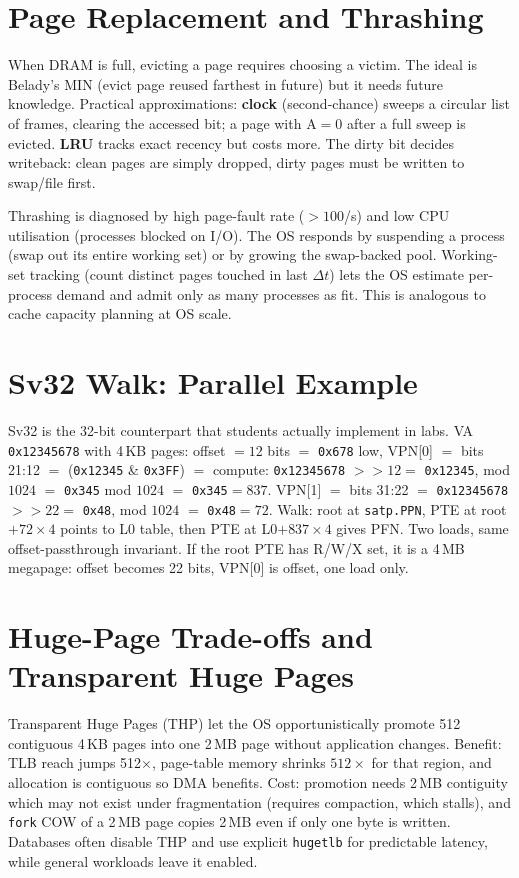 \section{Page Replacement and Thrashing}
When DRAM is full, evicting a page requires choosing a victim. The ideal is Belady's MIN (evict page reused farthest in future) but it needs future knowledge. Practical approximations: \textbf{clock} (second-chance) sweeps a circular list of frames, clearing the accessed bit; a page with A$=0$ after a full sweep is evicted. \textbf{LRU} tracks exact recency but costs more. The dirty bit decides writeback: clean pages are simply dropped, dirty pages must be written to swap/file first.

Thrashing is diagnosed by high page-fault rate ($>100$/s) and low CPU utilisation (processes blocked on I/O). The OS responds by suspending a process (swap out its entire working set) or by growing the swap-backed pool. Working-set tracking (count distinct pages touched in last $\Delta t$) lets the OS estimate per-process demand and admit only as many processes as fit. This is analogous to cache capacity planning at OS scale.
\section{Sv32 Walk: Parallel Example}
Sv32 is the 32-bit counterpart that students actually implement in labs. VA \texttt{0x12345678} with 4\,KB pages: offset $=12$ bits $=$ \texttt{0x678} low, VPN[0] $=$ bits 21:12 $=$ (\texttt{0x12345} \& \texttt{0x3FF}) $=$ compute: \texttt{0x12345678} $>>12=$ \texttt{0x12345}, mod $1024$ $=$ \texttt{0x345} mod $1024$ $=$ \texttt{0x345}$=837$. VPN[1] $=$ bits 31:22 $=$ \texttt{0x12345678} $>>22=$ \texttt{0x48}, mod $1024$ $=$ \texttt{0x48}$=72$. Walk: root at \texttt{satp.PPN}, PTE at root$+72\times4$ points to L0 table, then PTE at L0$+837\times4$ gives PFN. Two loads, same offset-passthrough invariant. If the root PTE has R/W/X set, it is a 4\,MB megapage: offset becomes 22 bits, VPN[0] is offset, one load only.

\section{Huge-Page Trade-offs and Transparent Huge Pages}
Transparent Huge Pages (THP) let the OS opportunistically promote 512 contiguous 4\,KB pages into one 2\,MB page without application changes. Benefit: TLB reach jumps 512$\times$, page-table memory shrinks $512\times$ for that region, and allocation is contiguous so DMA benefits. Cost: promotion needs 2\,MB contiguity which may not exist under fragmentation (requires compaction, which stalls), and \texttt{fork} COW of a 2\,MB page copies 2\,MB even if only one byte is written. Databases often disable THP and use explicit \texttt{hugetlb} for predictable latency, while general workloads leave it enabled.

